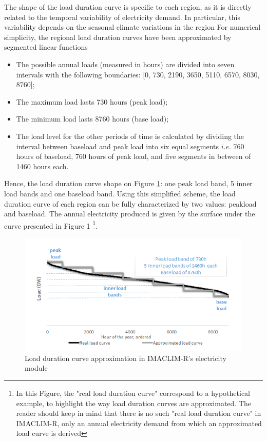 {The shape of the load duration curve is specific to each region, as it is directly related to the temporal variability of electricity demand. In particular, this variability depends on the seasonal climate variations in the region 
For numerical simplicity, the regional load duration curves have been approximated by segmented linear functions
\begin{itemize}
    \item The possible annual loads (measured in hours) are divided into seven intervals with the following boundaries: [0, 730, 2190, 3650, 5110, 6570, 8030, 8760];
    \item The maximum load lasts 730 hours (peak load);
    \item The minimum load lasts 8760 hours (base load);
    \item The load level for the other periods of time is calculated by dividing the interval between baseload and peak load into six equal segments $i.e.$ 760 hours of baseload, 760 hours of peak load, and five segments in between of 1460 hours each.
\end{itemize} 

Hence, the load duration curve shape on Figure \ref{fig:LDC}: one peak load band, 5 inner load bands and one baseload band.
Using this simplified scheme, the load duration curve of each region can be fully characterized by two values: peakload and baseload. The annual electricity produced is given by the surface under the curve presented in Figure \ref{fig:LDC} \footnote{In this Figure, the "real load duration curve" correspond to a hypothetical example, to highlight the way load duration curves are approximated. The reader should keep in mind that there is no such "real load duration curve" in IMACLIM-R, only an annual electricity demand from which an approximated load curve is derived}. 

\begin{figure}
\includegraphics{figures&tables/LDC.png}
\caption{Load duration curve approximation in IMACLIM-R's electricity module}
\centering
\label{fig:LDC}
\end{figure}


}
